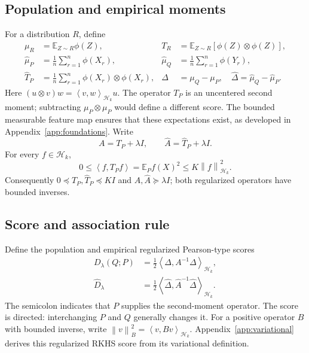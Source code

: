\documentclass[11pt,a4paper]{article}
\theoremstyle{definition}
\theoremstyle{remark}
\newcommand{\HH}{\mathcal H_k}
\newcommand{\E}{\mathbb E}
\newcommand{\norm}[1]{\left\lVert#1\right\rVert}
\newcommand{\inner}[2]{\left\langle#1,#2\right\rangle}
\newcommand{\D}{D_\lambda(Q;P)}
\newcommand{\Dh}{\widehat D_\lambda}
\begin{document}
\subsection{Population and empirical moments}
For a distribution $R$, define
\begin{align}
 \mu_R&=\E_{Z\sim R}\phi(Z),&
 T_R&=\E_{Z\sim R}[\phi(Z)\otimes\phi(Z)],\label{eq:pop-moments}\\
 \widehat\mu_P&=\frac1n\sum_{r=1}^n\phi(X_r),&
 \widehat\mu_Q&=\frac1n\sum_{r=1}^n\phi(Y_r),\label{eq:emp-means}\\
 \widehat T_P&=\frac1n\sum_{r=1}^n\phi(X_r)\otimes\phi(X_r),&
 \Delta&=\mu_Q-\mu_P,\quad
 \widehat\Delta=\widehat\mu_Q-\widehat\mu_P.\label{eq:emp-moments}
\end{align}
Here $(u\otimes v)w=\inner{v}{w}_{\HH}u$.
The operator $T_P$ is an uncentered second moment; subtracting
$\mu_P\otimes\mu_P$ would define a different score.
The bounded measurable feature map ensures that these expectations
exist, as developed in Appendix~\ref{app:foundations}.
Write
\begin{equation}\label{eq:A}
 A=T_P+\lambda I,\qquad \widehat A=\widehat T_P+\lambda I.
\end{equation}
For every $f\in\HH$,
\begin{equation}\label{eq:quadratic}
 0\le\inner{f}{T_Pf}=\E_P f(X)^2\le K\norm{f}_{\HH}^2.
\end{equation}
Consequently $0\preceq T_P,\widehat T_P\preceq KI$ and
$A,\widehat A\succeq\lambda I$; both regularized operators have
bounded inverses.

\subsection{Score and association rule}
Define the population and empirical regularized Pearson-type scores
\begin{align}
 \D&=\frac12\inner{\Delta}{A^{-1}\Delta}_{\HH},\label{eq:D}\\
 \Dh&=\frac12\inner{\widehat\Delta}
                    {\widehat A^{-1}\widehat\Delta}_{\HH}.\label{eq:Dhat}
\end{align}
The semicolon indicates that $P$ supplies the second-moment operator.
The score is directed: interchanging $P$ and $Q$ generally changes it.
For a positive operator $B$ with bounded inverse, write
$\norm{v}_B^2=\inner{v}{Bv}_{\HH}$.
Appendix~\ref{app:variational} derives this regularized RKHS score
from its variational definition.
\end{document}

